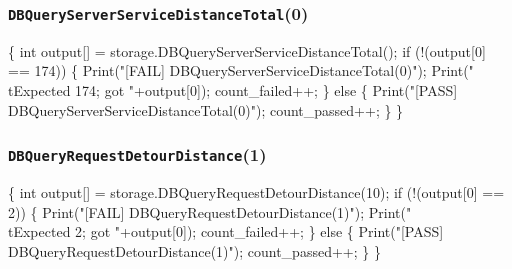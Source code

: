 \documentclass{article}
\def\nwendcode{\endtrivlist \endgroup}
\let\nwdocspar=\par
\theoremstyle{definition}
\begin{document}
\subsubsection{{\tt{}DBQueryServerServiceDistanceTotal}(0)}
\nwenddocs{}\endmoddef{}
\{
  int output[] = storage.DBQueryServerServiceDistanceTotal();
  if (!(output[0] == 174)) \{
    Print("[FAIL] DBQueryServerServiceDistanceTotal(0)");
    Print("\\tExpected 174; got "+output[0]);
    count_failed++;
  \} else \{
    Print("[PASS] DBQueryServerServiceDistanceTotal(0)");
    count_passed++;
  \}
\}
\nwendcode{}\nwdocspar
\subsubsection{{\tt{}DBQueryRequestDetourDistance}(1)}
\nwenddocs{}\endmoddef{}
\{
  int output[] = storage.DBQueryRequestDetourDistance(10);
  if (!(output[0] == 2)) \{
    Print("[FAIL] DBQueryRequestDetourDistance(1)");
    Print("\\tExpected 2; got "+output[0]);
    count_failed++;
  \} else \{
    Print("[PASS] DBQueryRequestDetourDistance(1)");
    count_passed++;
  \}
\}
\nwendcode{}\nwdocspar
\end{document}
